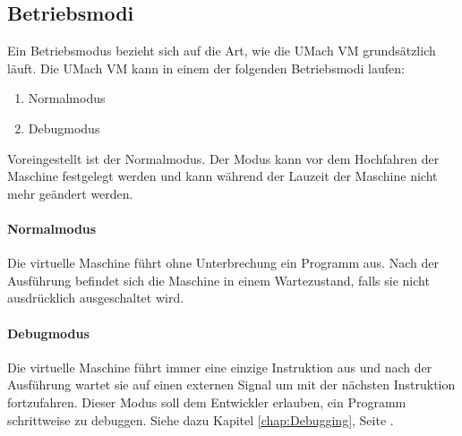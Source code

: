 \subsection{Betriebsmodi}
\label{subsec:Betriebsmodi}

Ein \gls{Betriebsmodus} bezieht sich auf die Art, wie die UMach VM grundsätzlich
läuft. Die UMach VM kann in einem der folgenden Betriebsmodi laufen:

\begin{enumerate}
  \item Normalmodus
  \item Debugmodus
\end{enumerate}

Voreingestellt ist der Normalmodus. Der Modus kann vor dem Hochfahren der
Maschine festgelegt werden und kann während der Lauzeit der Maschine nicht mehr
geändert werden.

\paragraph{Normalmodus} Die virtuelle Maschine führt ohne Unterbrechung ein
Programm aus. Nach der Ausführung befindet sich die Maschine in einem
Wartezustand, falls sie nicht ausdrücklich ausgeschaltet wird.

\paragraph{Debugmodus} Die virtuelle Maschine führt immer eine einzige
Instruktion aus und nach der Ausführung wartet sie auf einen externen Signal um
mit der nächsten Instruktion fortzufahren. Dieser Modus soll dem Entwickler
erlauben, ein Programm schrittweise zu debuggen.
Siehe dazu Kapitel \ref{chap:Debugging}, Seite \pageref{chap:Debugging}.

